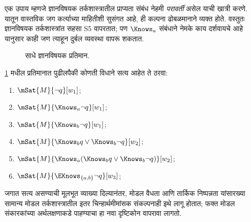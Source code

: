 एक उपाय म्हणजे ज्ञानविषयक तर्कशास्त्रातील प्राप्यता
संबंध नेहमी \emph{परावर्ती} असेल याची खात्री करणे.
यातून वास्तविक जग कर्त्याच्या माहितीशी सुसंगत आहे,
ही कल्पना ढोबळमानाने व्यक्त होते. वस्तुतः ज्ञानविषयक
तर्कशास्त्रांत सहसा S5 वापरतात; पण $\Knows_a$ संबंधाने
नेमके काय दर्शवायचे आहे यानुसार काही जण त्याहून
दुर्बल व्यवस्था वापरू शकतात.

\begin{figure}
  \begin{center}
  \end{center}
  \caption{साधे ज्ञानविषयक प्रतिमान.}
  \label{aml:el:trw:fig:simple}
\end{figure}

\begin{prob}
  \ref{aml:el:trw:fig:simple} मधील प्रतिमानात
  पुढीलपैकी कोणती विधाने सत्य आहेत ते ठरवा:
  \begin{enumerate}
    \item $\mSat{M}{\lnot q}[w_1]$;
    \item $\mSat{M}{\Knows_a \lnot q}[w_1]$;
    \item $\mSat{M}{\Knows_b \lnot q}[w_1]$;
    \item $\mSat{M}{\Knows_b q \lor \Knows_b \lnot q}[w_2]$;
    \item $\mSat{M}{\Knows_a( \Knows_b q \lor \Knows_b \lnot q)}[w_2]$;
    \item $\mSat{M}{\EKnows_{\{a,b\}} \lnot q}[w_3]$;
    \end{enumerate}
\end{prob}

जगात सत्य असण्याची मूलभूत व्याख्या दिल्यानंतर,
मोडल वैधता आणि तार्किक निष्पन्नता यांसारख्या सामान्य
मोडल तर्कशास्त्रातील इतर चिन्हार्थमीमांसक संकल्पनाही
इथे लागू होतात; फक्त मोडल संकारकांच्या अर्थलक्षणाकडे
पाहण्याचा हा नवा दृष्टिकोन वापरावा लागतो.

